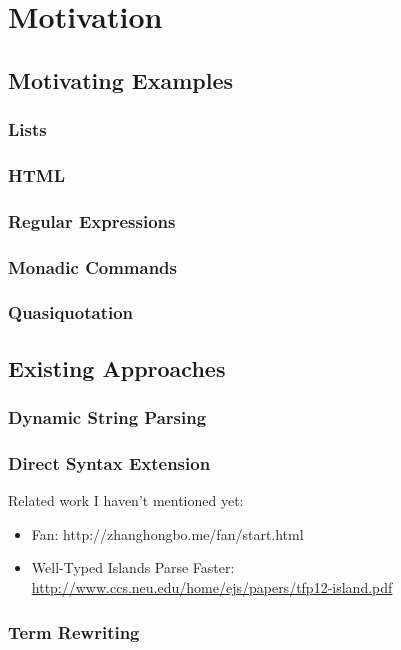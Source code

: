 
\chapter{Motivation}\label{chap:syntax-motivation}
\section{Motivating Examples}\label{sec:syntax-examples}
\subsection{Lists}\label{sec:syntax-examples-lists}
\subsection{HTML}\label{sec:syntax-examples-html}
\subsection{Regular Expressions}\label{sec:syntax-examples-regexps}
\subsection{Monadic Commands}\label{sec:syntax-examples-monads}
\subsection{Quasiquotation}\label{sec:syntax-examples-quasiquotation}
\section{Existing Approaches}\label{sec:syntax-existing-approaches}
\subsection{Dynamic String Parsing}\label{sec:dynamic-string-parsing}
\subsection{Direct Syntax Extension}\label{sec:direct-syntax-extension}

Related work I haven't mentioned yet:
\begin{itemize}
\item Fan: http://zhanghongbo.me/fan/start.html
\item Well-Typed Islands Parse Faster: \\\url{http://www.ccs.neu.edu/home/ejs/papers/tfp12-island.pdf}
\end{itemize}
\subsection{Term Rewriting}\label{sec:term-rewriting}
